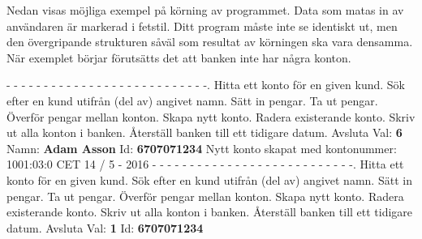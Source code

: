 Nedan visas möjliga exempel på körning av programmet. Data som matas in av användaren är markerad i fetstil.
Ditt program måste inte se identiskt ut, men den övergripande strukturen såväl som resultat av körningen ska vara densamma.
När exemplet börjar förutsätts det att banken inte har några konton.
\begin{multicols}{2}
\noindent
- - - - - - - - - - - - - - - - - - - - - - - - - - -.   Hitta ett konto för en given kund.   Sök efter en kund utifrån (del av) angivet namn.   Sätt in pengar.   Ta ut pengar.   Överför pengar mellan konton.   Skapa nytt konto.   Radera existerande konto.   Skriv ut alla konton i banken.   Återställ banken till ett tidigare datum. Avsluta\newline
Val: \textbf{6}\newline
Namn: \textbf{Adam Asson}\newline
Id: \textbf{6707071234}\newline
Nytt konto skapat med kontonummer: 1001:03:0 CET 14 / 5 - 2016\newline
- - - - - - - - - - - - - - - - - - - - - - - - - - -.   Hitta ett konto för en given kund.   Sök efter en kund utifrån (del av) angivet namn.   Sätt in pengar.   Ta ut pengar.   Överför pengar mellan konton.   Skapa nytt konto.   Radera existerande konto.   Skriv ut alla konton i banken.   Återställ banken till ett tidigare datum. Avsluta\newline
Val: \textbf{1}\newline
Id: \textbf{6707071234}\newline

\end{multicols}

